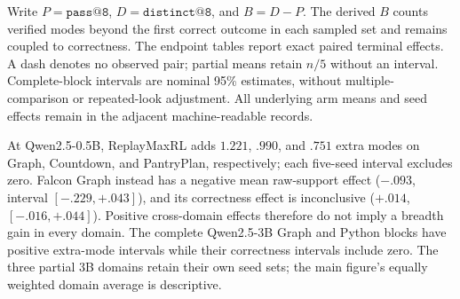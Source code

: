 \documentclass{article}
\newcommand{\1}{\mathbf 1}
\theoremstyle{remark}
\theoremstyle{definition}
\theoremstyle{plain}
\begin{document}
Write $P=\texttt{pass@8}$, $D=\texttt{distinct@8}$, and $B=D-P$.
The derived $B$ counts verified modes beyond the first correct outcome in
each sampled set and remains coupled to correctness. The endpoint tables
report exact paired terminal effects. A dash denotes no observed pair;
partial means retain $n/5$ without an interval. Complete-block intervals
are nominal 95\% estimates, without multiple-comparison or repeated-look
adjustment. All underlying arm means and seed effects remain in the
adjacent machine-readable records.

\begin{table}[H]
  \centering
  \caption{\textbf{ReplayMaxRL effects across model scales at pass 8.}
  All effects are ReplayMaxRL minus MaxRL on the displayed paired seeds.
  Brackets give paired Student-$t$ intervals for $\Delta B$ in complete blocks.
  The machine-readable report also retains both arm means, all per-seed
  effects, and intervals for $P$ and $D$.}
  \label{tab:current-e118}
  \scriptsize
  \setlength{\tabcolsep}{3pt}
\end{table}


At Qwen2.5-0.5B, ReplayMaxRL adds $1.221$, $.990$, and $.751$ extra modes
on Graph, Countdown, and PantryPlan, respectively; each five-seed interval
excludes zero. Falcon Graph instead has a negative mean raw-support effect
($-.093$, interval $[-.229,+.043]$), and its correctness effect is inconclusive
($+.014$, $[-.016,+.044]$). Positive cross-domain effects therefore do not
imply a breadth gain in every domain. The complete Qwen2.5-3B Graph and Python
blocks have positive extra-mode intervals while their correctness intervals
include zero. The three partial 3B domains retain their own seed sets;
the main figure's equally weighted domain average is descriptive.
\end{document}
